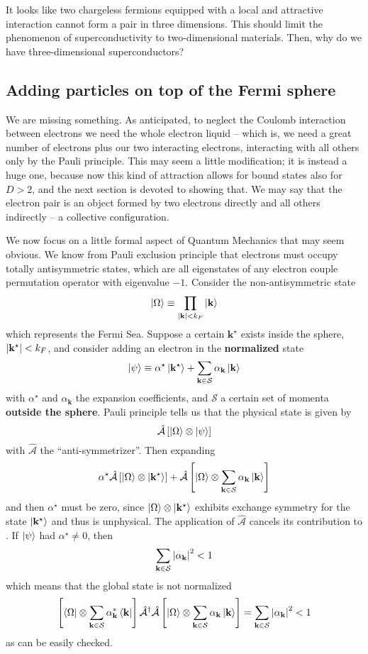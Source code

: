 It looks like two chargeless fermions equipped with a local and attractive interaction cannot form a pair in three dimensions. This should limit the phenomenon of superconductivity to two-dimensional materials. Then, why do we have three-dimensional superconductors? 

\subsection{Adding particles on top of the Fermi sphere}\label{subsec:adding particles on top of the fermi sphere}

We are missing something. As anticipated, to neglect the Coulomb interaction between electrons we need the whole electron liquid -- which is, we need a great number of electrons plus our two interacting electrons, interacting with all others only by the Pauli principle. This may seem a little modification; it is instead a huge one, because now this kind of attraction allows for bound states also for $D>2$, and the next section is devoted to showing that. We may say that the electron pair is an object formed by two electrons directly and all others indirectly -- a collective configuration.

We now focus on a little formal aspect of Quantum Mechanics that may seem obvious. We know from Pauli exclusion principle that electrons must occupy totally antisymmetric states, which are all eigenstates of any electron couple permutation operator with eigenvalue $-1$. Consider the non-antisymmetric state
\[
	\ket{\Omega} \equiv \prod_{\abs{\mathbf{k}} < k_F} \ket{\mathbf{k}}
\]
which represents the Fermi Sea. Suppose a certain $\mathbf{k}^\star$ exists inside the sphere, $\abs{\mathbf{k}^\star} < k_F$, and consider adding an electron in the \textbf{normalized} state
\[
	\ket{\psi} \equiv \alpha^\star \ket{\mathbf{k}^\star} + \sum_{\mathbf{k}\in\mathcal{S}} \alpha_\mathbf{k} \ket{\mathbf{k}}
\]
with $\alpha^\star$ and $\alpha_\mathbf{k}$ the expansion coefficients, and $\mathcal{S}$ a certain set of momenta \textbf{outside the sphere}. Pauli principle tells us that the physical state is given by
\[
	\hat{\mathcal{A}} \left[{\ket{\Omega}\otimes\ket{\psi}}\right]
\]
with $\hat{\mathcal{A}}$ the ``anti-symmetrizer''. Then expanding
\[
	\alpha^\star \hat{\mathcal{A}} \left[{\ket{\Omega}\otimes \ket{\mathbf{k}^\star}}\right] + \hat{\mathcal{A}} \left[{\ket{\Omega}\otimes\sum_{\mathbf{k}\in\mathcal{S}} \alpha_\mathbf{k} \ket{\mathbf{k}}}\right]
\]
and then $\alpha^\star$ must be zero, since $\ket{\Omega}\otimes \ket{\mathbf{k}^\star}$ exhibits exchange symmetry for the state $\ket{\mathbf{k}^\star}$ and thus is unphysical. The application of $\hat{\mathcal{A}}$ cancels its contribution to . If $\ket{\psi}$ had $\alpha^\star \neq 0$, then
\[
	\sum_{\mathbf{k}\in\mathcal{S}} \abs{\alpha_\mathbf{k}}^2 < 1
\]
which means that the global state is not normalized
\[
	\left[{\bra{\Omega}\otimes\sum_{\mathbf{k}\in\mathcal{S}} \alpha_\mathbf{k}^* \bra{\mathbf{k}}}\right] \hat{\mathcal{A}}^\dagger \hat{\mathcal{A}} \left[{\ket{\Omega}\otimes\sum_{\mathbf{k}\in\mathcal{S}} \alpha_\mathbf{k} \ket{\mathbf{k}}}\right] = \sum_{\mathbf{k}\in\mathcal{S}} \abs{\alpha_\mathbf{k}}^2 < 1
\]
as can be easily checked.


